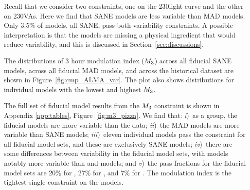 Recall that we consider two constraints, one on the 230\GHz light curve and the other on 230\GHz VAs.  Here we find that SANE models are less variable than MAD models. Only 3.5\% of models, all SANE, pass both variability constraints.  A possible interpretation is that the models are missing a physical ingredient that would reduce variability, and this is discussed in Section~\ref{sec:discussions}.


The distributions of 3 hour modulation index ($M_{3}$) across all fiducial SANE models, across all fiducial MAD models, and across the historical dataset are shown in Figure~\ref{fig:cmp_ALMA_var}.
The plot also shows distributions for individual models with the lowest and highest $M_{3}$.

The full set of fiducial model results from the $M_{3}$ constraint is shown in Appendix \ref{app:tables}, Figure~\ref{fig:m3_pizza}.
We find that:
\emph{i})~as a group, the fiducial models are more variable than the data;
\emph{ii})~the MAD models are more variable than SANE models;
\emph{iii})~eleven individual models  pass the constraint for all fiducial model sets, and these are exclusively SANE models;
\emph{iv})~there are some differences between variability in the fiducial model sets, with \hamr models notably more variable than \kharma and \bhac models; and
\emph{v})~the pass fractions for the fiducial model sets are 20\% for \kharma, 27\% for \bhac, and 7\% for \hamr.
The modulation index is the tightest single constraint on the models.


